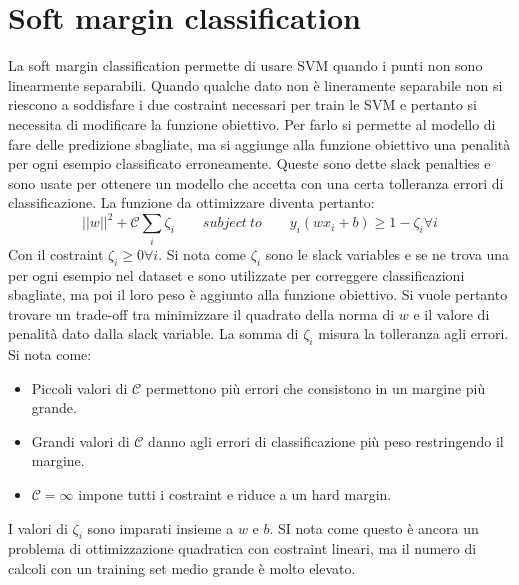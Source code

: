 \section{Soft margin classification}
La soft margin classification permette di usare SVM quando i punti non sono linearmente separabili.
Quando qualche dato non \`e lineramente separabile non si riescono a soddisfare i due costraint necessari per train le SVM e pertanto si necessita di modificare la funzione obiettivo.
Per farlo si permette al modello di fare delle predizione sbagliate, ma si aggiunge alla funzione obiettivo una penalit\`a per ogni esempio classificato erroneamente.
Queste sono dette slack penalties e sono usate per ottenere un modello che accetta con una certa tolleranza errori di classificazione.
La funzione da ottimizzare diventa pertanto:
$$||w||^2+\mathcal{C}\sum_i\zeta_i\qquad subject\ to\qquad y_i(wx_i+b)\ge 1 -\zeta_i\forall i$$
Con il costraint $\zeta_i\ge 0\forall i$.
Si nota come $\zeta_i$ sono le slack variables e se ne trova una per ogni esempio nel dataset e sono utilizzate per correggere classificazioni sbagliate, ma poi il loro peso \`e aggiunto alla funzione obiettivo.
Si vuole pertanto trovare un trade-off tra minimizzare il quadrato della norma di $w$ e il valore di penalit\`a dato dalla slack variable.
La somma di $\zeta_i$ misura la tolleranza agli errori.
Si nota come:
\begin{multicols}{2}
	\begin{itemize}
		\item Piccoli valori di $\mathcal{C}$ permettono pi\`u errori che consistono in un margine pi\`u grande.
		\item Grandi valori di $\mathcal{C}$ danno agli errori di classificazione pi\`u peso restringendo il margine.
		\item $\mathcal{C} = \infty$ impone tutti i costraint e riduce a un hard margin.
	\end{itemize}
\end{multicols}
I valori di $\zeta_i$ sono imparati insieme a $w$ e $b$.
SI nota come questo \`e ancora un problema di ottimizzazione quadratica con costraint lineari, ma il numero di calcoli con un training set medio grande \`e molto elevato.

